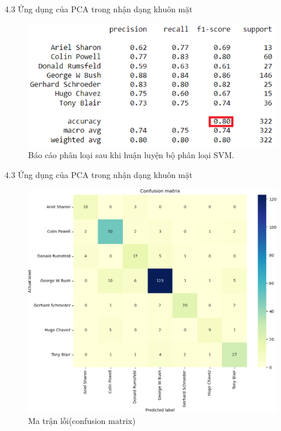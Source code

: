 \documentclass[notheorems,envcountsect,hyperref=unicode]{beamer}
\begin{document}
\begin{frame}{4.3 Ứng dụng của PCA trong nhận dạng khuôn mặt}
\begin{figure}[htp]
	\centering
	\includegraphics[scale=0.4]{result_svm.png}
	\caption{Báo cáo phân loại sau khi huận luyện bộ phân loại SVM.}
	\label{fig:svm_result}
\end{figure}
\end{frame}

\begin{frame}{4.3 Ứng dụng của PCA trong nhận dạng khuôn mặt}
\begin{figure}[htp]
	\hspace*{-2cm} 
	\includegraphics[scale=0.3]{heatmap.png}
	\caption{Ma trận lỗi(confusion matrix)}
	\label{fig:headmap}
\end{figure}
\end{frame}
\end{document}
